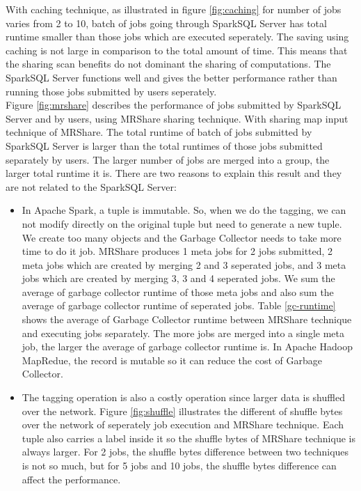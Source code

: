 With caching technique, as illustrated in figure \ref{fig:caching} for number of jobs varies from 2 to 10, batch of jobs going through SparkSQL Server has total runtime smaller than those jobs which are executed seperately. The saving using caching is not large in comparison to the total amount of time. This means that the sharing scan benefits do not dominant the sharing of computations. The SparkSQL Server functions well and gives the better performance rather than running those jobs submitted by users seperately.\\

Figure \ref{fig:mrshare} describes the performance of jobs submitted by SparkSQL Server and by users, using MRShare sharing technique. With sharing map input technique of MRShare. The total runtime of batch of jobs submitted by SparkSQL Server is larger than the total runtimes of those jobs submitted separately by users. The larger number of jobs are merged into a group, the larger total runtime it is. There are two reasons to explain this result and they are not related to the SparkSQL Server:\\
\begin{itemize}
\item In Apache Spark, a tuple  is immutable. So, when we do the tagging, we can not modify directly on the original tuple but need to generate a new tuple. We create too many objects and the Garbage Collector needs to take more time to do it job. MRShare produces 1 meta jobs for 2 jobs submitted, 2 meta jobs which are created by merging 2 and 3 seperated jobs, and 3 meta jobs which are created by merging 3, 3 and 4 seperated jobs. We sum the average of garbage collector runtime of those meta jobs and also sum the average of garbage collector runtime of seperated jobs. Table \ref{gc-runtime} shows the average of Garbage Collector runtime between MRShare technique and executing jobs separately. The more jobs are merged into a single meta job, the larger the average of garbage collector runtime is. In Apache Hadoop MapRedue, the record is mutable so it can reduce the cost of Garbage Collector.
\item The tagging operation is also a costly operation since larger data is shuffled over the network. Figure \ref{fig:shuffle} illustrates the different of shuffle bytes over the network of seperately job execution and MRShare technique. Each tuple also carries a label inside it so the shuffle bytes of MRShare technique is always larger. For 2 jobs, the shuffle bytes difference between two techniques is not so much, but for 5 jobs and 10 jobs, the shuffle bytes difference can affect the performance.
\end{itemize}

